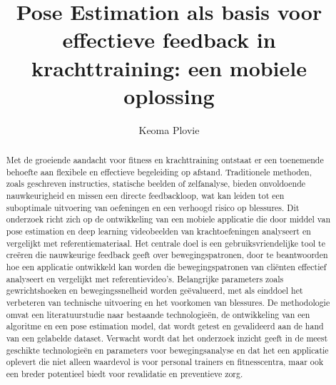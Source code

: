 \documentclass{hogent-article}
\title{Pose Estimation als basis voor effectieve feedback in krachttraining: een mobiele oplossing}
\author{Keoma Plovie}
\begin{document}
\begin{abstract}
  Met de groeiende aandacht voor fitness en krachttraining ontstaat er een toenemende behoefte aan flexibele en effectieve begeleiding op afstand. Traditionele methoden, zoals geschreven instructies, statische beelden of zelfanalyse, bieden onvoldoende nauwkeurigheid en missen een directe feedbackloop, wat kan leiden tot een suboptimale uitvoering van oefeningen en een verhoogd risico op blessures. Dit onderzoek richt zich op de ontwikkeling van een mobiele applicatie die door middel van pose estimation en deep learning videobeelden van krachtoefeningen analyseert en vergelijkt met referentiemateriaal. Het centrale doel is een gebruiksvriendelijke tool te creëren die nauwkeurige feedback geeft over bewegingspatronen, door te beantwoorden hoe een applicatie ontwikkeld kan worden die bewegingspatronen van cliënten effectief analyseert en vergelijkt met referentievideo’s. Belangrijke parameters zoals gewrichtshoeken en bewegingssnelheid worden geëvalueerd, met als einddoel het verbeteren van technische uitvoering en het voorkomen van blessures. De methodologie omvat een literatuurstudie naar bestaande technologieën, de ontwikkeling van een algoritme en een pose estimation model, dat wordt getest en gevalideerd aan de hand van een gelabelde dataset. Verwacht wordt dat het onderzoek inzicht geeft in de meest geschikte technologieën en parameters voor bewegingsanalyse en dat het een applicatie oplevert die niet alleen waardevol is voor personal trainers en fitnesscentra, maar ook een breder potentieel biedt voor revalidatie en preventieve zorg.
\end{abstract}

\tableofcontents



\printbibliography[heading=bibintoc]
\end{document}
